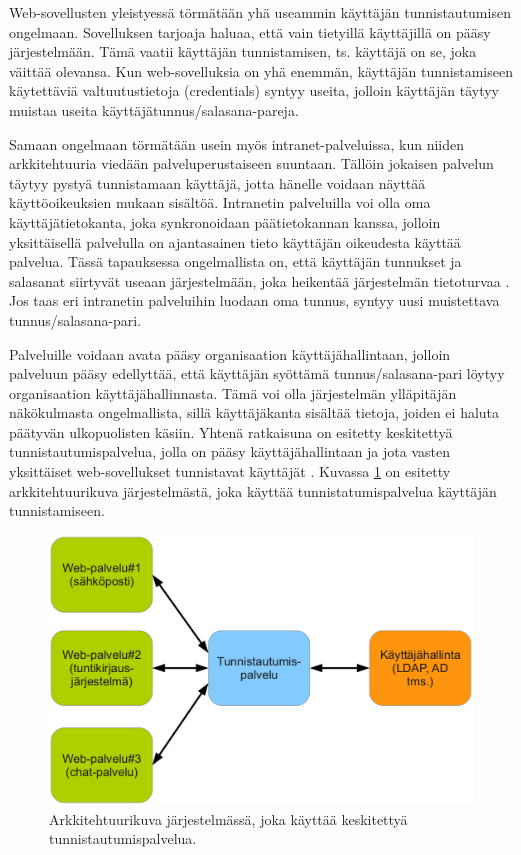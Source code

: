 Web-sovellusten yleistyessä törmätään yhä useammin käyttäjän tunnistautumisen ongelmaan. Sovelluksen tarjoaja haluaa, että vain tietyillä käyttäjillä on pääsy järjestelmään. Tämä vaatii käyttäjän tunnistamisen, ts. käyttäjä on se, joka väittää olevansa. Kun web-sovelluksia on yhä enemmän, käyttäjän tunnistamiseen käytettäviä valtuutustietoja (credentials) syntyy useita, jolloin käyttäjän täytyy muistaa useita käyttäjätunnus/salasana-pareja.

Samaan ongelmaan törmätään usein myös intranet-palveluissa, kun niiden arkkitehtuuria viedään palveluperustaiseen suuntaan. Tällöin jokaisen palvelun täytyy pystyä tunnistamaan käyttäjä, jotta hänelle voidaan näyttää käyttöoikeuksien mukaan sisältöä. Intranetin palveluilla voi olla oma käyttäjätietokanta, joka synkronoidaan päätietokannan kanssa, jolloin yksittäisellä palvelulla on ajantasainen tieto käyttäjän oikeudesta käyttää palvelua. Tässä tapauksessa ongelmallista on, että käyttäjän tunnukset ja salasanat siirtyvät useaan järjestelmään, joka heikentää järjestelmän tietoturvaa \cite{nisti}. Jos taas eri intranetin palveluihin luodaan oma tunnus, syntyy uusi muistettava tunnus/salasana-pari.

Palveluille voidaan avata pääsy organisaation käyttäjähallintaan, jolloin palveluun pääsy edellyttää, että käyttäjän syöttämä tunnus/salasana-pari löytyy organisaation käyttäjähallinnasta. Tämä voi olla järjestelmän ylläpitäjän näkökulmasta ongelmallista, sillä käyttäjäkanta sisältää tietoja, joiden ei haluta päätyvän ulkopuolisten käsiin. Yhtenä ratkaisuna on esitetty keskitettyä tunnistautumispalvelua, jolla on pääsy käyttäjähallintaan ja jota vasten yksittäiset web-sovellukset tunnistavat käyttäjät \cite{nisti}. Kuvassa \ref{johdanto_kuva} on esitetty arkkitehtuurikuva järjestelmästä, joka käyttää tunnistatumispalvelua käyttäjän tunnistamiseen.

\begin{figure}[ht]
\centering
\includegraphics[width=.7\textwidth]{misc/johdanto_kuva.eps}
\caption{Arkkitehtuurikuva järjestelmässä, joka käyttää keskitettyä tunnistautumispalvelua.}%
\label{johdanto_kuva}
\end{figure}

